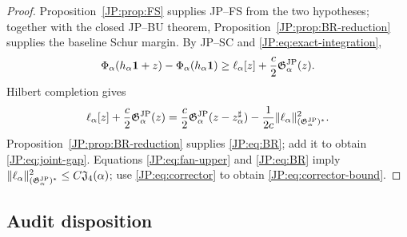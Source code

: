 \documentclass[11pt]{amsart}
\numberwithin{equation}{section}
\theoremstyle{definition}
\theoremstyle{remark}
\newcommand{\Jfour}{\mathfrak J_4}
\newcommand{\Gjp}{\mathfrak G^{\rm JP}}
\begin{document}
\begin{proof}
Proposition~\ref{JP:prop:FS} supplies JP--FS from the two hypotheses; together
with the closed JP--BU theorem, Proposition~\ref{JP:prop:BR-reduction} supplies
the baseline Schur margin.
By JP--SC and \eqref{JP:eq:exact-integration},
\[
 \Phi_\alpha(h_\alpha\mathbf1+z)-\Phi_\alpha(h_\alpha\mathbf1)
 \ge \ell_\alpha[z]+\frac c2\Gjp_\alpha(z).
\]
Hilbert completion gives
\[
 \ell_\alpha[z]+\frac c2\Gjp_\alpha(z)
 =\frac c2\Gjp_\alpha(z-z_\alpha^\sharp)
 -\frac1{2c}\|\ell_\alpha\|_{(\Gjp_\alpha)^*}^2.
\]
Proposition~\ref{JP:prop:BR-reduction} supplies \eqref{JP:eq:BR}; add it to
obtain \eqref{JP:eq:joint-gap}.  Equations
\eqref{JP:eq:fan-upper} and \eqref{JP:eq:BR} imply
$\|\ell_\alpha\|_{(\Gjp_\alpha)^*}^2\le C\Jfour(\alpha)$; use
\eqref{JP:eq:corrector} to obtain \eqref{JP:eq:corrector-bound}.
\end{proof}

\subsection{Audit disposition}
\end{document}
